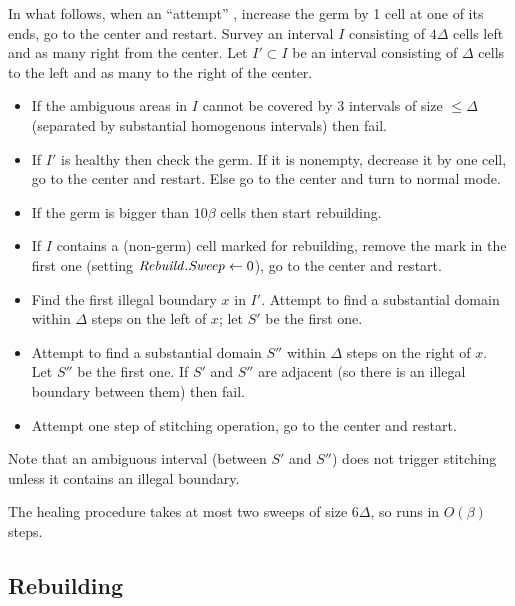 \documentclass[11pt]{memoir}
\theoremstyle{definition} %
\renewcommand{\le}{\leq}
\newcommand{\fld}[1]{\ensuremath{\textit{#1\/}}}
\newcommand{\Rebuild}{\fld{Rebuild}} %
\newcommand{\Sweep}{\fld{Sweep}} %
\begin{document}
  In what follows, when an ``attempt'' , 
increase the germ by 1 cell at one of its ends, go to the center and restart.  
Survey an interval \( I \) consisting of \( 4\Delta \) cells left and as many right from the center.
Let \( I'\subset I \) be an interval consisting of \( \Delta \) cells to the left and as
many to the right of the center.
\bigskip
{\newcommand{\instr}{\item[]\hspace{-0.6em}}
  \begin{itemize}
    \instr If the ambiguous areas in \( I \) cannot be covered by 3 intervals of size \( \le\Delta \) (separated by
    substantial homogenous intervals) then fail.

\instr If \( I' \) is healthy then check the germ.
  If it is nonempty, decrease it by one cell, go to the center and restart.
  Else go to the center and turn to normal mode.
  
\instr If the germ is bigger than \( 10\beta \) cells then start rebuilding.

\instr  If \( I \) contains a (non-germ) cell marked for rebuilding, remove the mark in the first one
  (setting \( \Rebuild.\Sweep\gets 0 \)), go to the center and restart. 
  
\instr Find the first illegal boundary \( x \) in \( I' \).
  Attempt to find a substantial domain within \( \Delta \) steps on the left of \( x \);
  let \( S' \) be the first one.

\instr  Attempt to find a substantial domain \( S'' \) within \( \Delta \) steps on the right of \( x \).
  Let \( S'' \) be the first one.
  If \( S' \) and \( S'' \) are adjacent (so there is an illegal boundary between them) then fail.

\instr  Attempt one step of stitching operation, go to the center and restart.

\end{itemize}
}
\bigskip

Note that an ambiguous interval (between \( S' \) and \( S'' \)) does not trigger stitching unless
it contains an illegal boundary.

The healing procedure takes at most two sweeps of size \( 6\Delta \), so runs in \( O(\beta) \) 
steps.


\subsection{Rebuilding}\label{sec:rebuilding}
\end{document}
